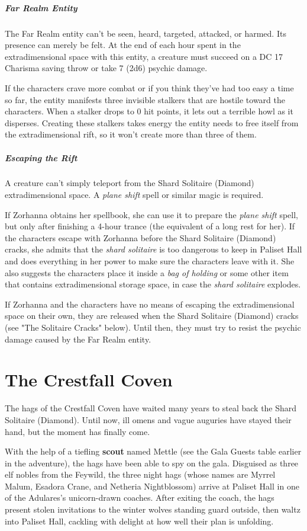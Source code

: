 \documentclass[10pt,a4paper,twoside,bg=print,twocolumn,openany,nodeprecatedcode]{dndbook}
\begin{document}
\subparagraph{Far Realm Entity}
The Far Realm entity can't be seen, heard, targeted, attacked, or harmed. Its presence can merely be felt. At the end of each hour spent in the extradimensional space with this entity, a creature must succeed on a DC 17 Charisma saving throw or take 7 (2d6) psychic damage.

If the characters crave more combat or if you think they've had too easy a time so far, the entity manifests three invisible stalkers that are hostile toward the characters. When a stalker drops to 0 hit points, it lets out a terrible howl as it disperses. Creating these stalkers takes energy the entity needs to free itself from the extradimensional rift, so it won't create more than three of them.

\subparagraph{Escaping the Rift}
A creature can't simply teleport from the Shard Solitaire (Diamond) extradimensional space. A \textit{plane shift} spell or similar magic is required.

If Zorhanna obtains her spellbook, she can use it to prepare the \textit{plane shift} spell, but only after finishing a 4-hour trance (the equivalent of a long rest for her). If the characters escape with Zorhanna before the Shard Solitaire (Diamond) cracks, she admits that the \textit{shard solitaire} is too dangerous to keep in Paliset Hall and does everything in her power to make sure the characters leave with it. She also suggests the characters place it inside a \textit{bag of holding} or some other item that contains extradimensional storage space, in case the \textit{shard solitaire} explodes.

If Zorhanna and the characters have no means of escaping the extradimensional space on their own, they are released when the Shard Solitaire (Diamond) cracks (see "The Solitaire Cracks" below). Until then, they must try to resist the psychic damage caused by the Far Realm entity.

\section{The Crestfall Coven}
The hags of the Crestfall Coven have waited many years to steal back the Shard Solitaire (Diamond). Until now, ill omens and vague auguries have stayed their hand, but the moment has finally come.

With the help of a tiefling \textbf{scout} named Mettle (see the Gala Guests table earlier in the adventure), the hags have been able to spy on the gala. Disguised as three elf nobles from the Feywild, the three night hags (whose names are Myrrel Malum, Esadora Crane, and Netheria Nightblossom) arrive at Paliset Hall in one of the Adulares's unicorn-drawn coaches. After exiting the coach, the hags present stolen invitations to the winter wolves standing guard outside, then waltz into Paliset Hall, cackling with delight at how well their plan is unfolding.
\end{document}
